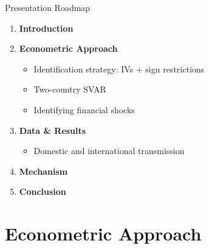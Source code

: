 \documentclass[10pt]{beamer}
\begin{document}
\begin{frame}{Presentation Roadmap}
\begin{enumerate}
    \item \textbf{Introduction}
    \vspace{0.4em}
    \item \textbf{Econometric Approach}
    \begin{itemize}
        \item Identification strategy: IVs + sign restrictions
        \item Two-country SVAR
        \item Identifying financial shocks
    \end{itemize}
    \vspace{0.4em}
    \item \textbf{Data \& Results}
    \begin{itemize}
        \item Domestic and international transmission
    \end{itemize}
    \vspace{0.4em}
    \item \textbf{Mechanism}
    \vspace{0.4em}
    \item \textbf{Conclusion}
\end{enumerate}
\end{frame}


\section{Econometric Approach}
\end{document}

